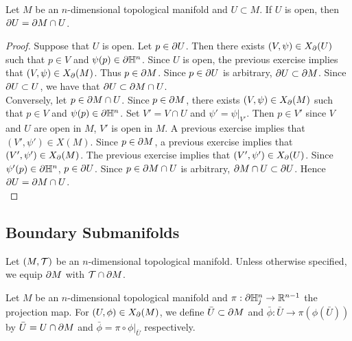 \documentclass{book}
\begin{document}
	\begin{ex} 
		Let $M$ be an $n$-dimensional topological manifold and $U \subset M$. If $U$ is open, then $\partial U = \partial M \cap U$.
	\end{ex}

	\begin{proof}
		Suppose that $U$ is open. Let $p \in \partial U$. Then there exists $(V, \psi) \in X_{\partial}(U)$ such that $p \in V$ and $\psi(p) \in \partial \mathbb{H}^n$. Since $U$ is open, the previous exercise implies that $(V, \psi) \in X_{\partial}(M)$. Thus $p \in \partial M$. Since $p \in \partial U$ is arbitrary, $\partial U \subset \partial M$. Since $\partial U \subset U$, we have that $\partial U \subset \partial M \cap U$.\\
		Conversely, let $p \in \partial M \cap U$. Since $p \in \partial M$, there exists $(V, \psi) \in X_{\partial}(M)$ such that $p \in V$ and $\psi(p) \in \partial \mathbb{H}^n$. Set $V' = V \cap U$ and $\psi' = \psi|_{V'}$. Then $p \in V'$ since $V$ and $U$ are open in $M$, $V'$ is open in $M$. A previous exercise implies that $(V', \psi') \in X(M)$. Since $p \in \partial M$, a previous exercise implies that $(V', \psi') \in X_{\partial}(M)$. The previous exercise implies that $(V', \psi') \in X_{\partial}(U)$. Since $\psi'(p) \in \partial \mathbb{H}^n$, $p \in \partial U$. Since $p \in \partial M \cap U$ is arbitrary, $\partial M \cap U \subset \partial U$. Hence  $\partial U = \partial M \cap U$. \\
	\end{proof}




















\subsection{Boundary Submanifolds}

\begin{note} 
	Let $(M, \mathcal{T})$ be an $n$-dimensional topological manifold. Unless otherwise specified, we equip $\partial M$ with $\mathcal{T} \cap \partial M$. 
\end{note}

\begin{defn}
	Let $M$ be an $n$-dimensional topological manifold and $\pi:\partial \mathbb{H}^n_j \rightarrow \mathbb{R}^{n-1}$ the projection map. For $(U, \phi) \in X_{\partial}(M)$, we define $\bar{U} \subset \partial M$ and $\bar{\phi}: \bar{U} \rightarrow \pi (\phi(\bar{U}))$ by $\bar{U} = U \cap \partial M$ and $\bar{\phi} = \pi \circ \phi|_{\bar{U}}$ respectively. 
\end{defn}
\end{document}
